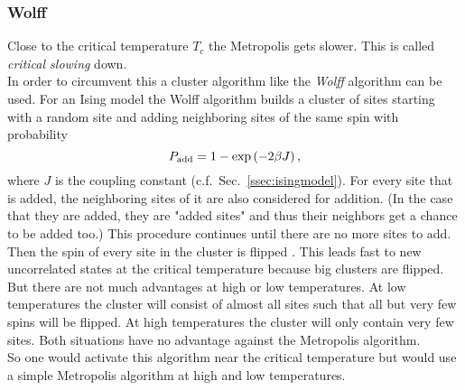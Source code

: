     \subsubsection{Wolff}
    \label{sssec:wolff}
        Close to the critical temperature \(T_c\) the Metropolis
        gets slower. This is called \emph{critical slowing} down.\\
        In order to circumvent this a cluster algorithm like the \emph{Wolff}
        algorithm \cite{Wolff1989} can be used.
        For an Ising model the Wolff algorithm builds a cluster of sites
        starting with a random site and adding neighboring sites of the
        same spin with probability
        \begin{equation}
            P_{\mathrm{add}} = 1-\exp\left(-2\beta J\right),
            \label{eq:wolffAdd}
        \end{equation}
        where \(J\) is the coupling constant (c.f.\ Sec.\ \ref{ssec:isingmodel}).
        For every site that is added, the neighboring sites of it are
        also considered for addition. (In the case that they are added,
        they are "added sites" and thus their neighbors get a chance to be
        added too.)
        This procedure continues until there are no more sites to add.
        Then the spin of every site in the cluster is flipped
        \cite[p. 91ff]{NewmanBarkema1999} \cite[p. 151f]{Katzgraber2011}.
        This leads fast to new uncorrelated states at the critical
        temperature because big clusters are flipped. But there are not
        much advantages at high or low temperatures. At low temperatures
        the cluster will consist of almost all sites such that all but
        very few spins will be flipped. At high temperatures the cluster
        will only contain very few sites.
        Both situations have no advantage against the Metropolis algorithm.\\
        So one would activate this algorithm near the critical temperature
        but would use a simple Metropolis algorithm at high and low temperatures.


